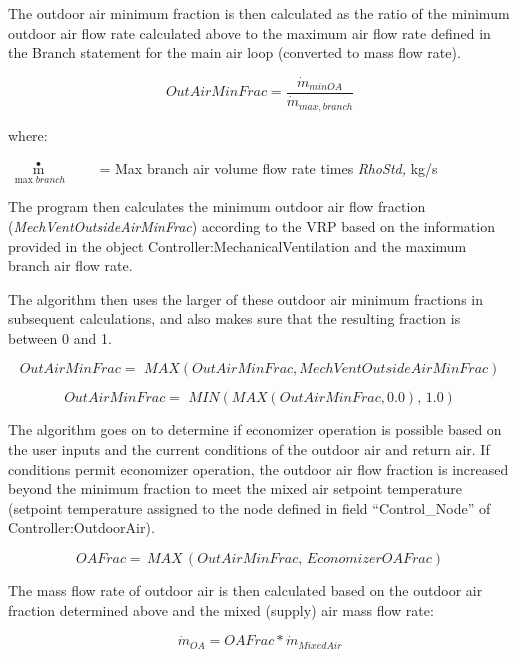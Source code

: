 The outdoor air minimum fraction is then calculated as the ratio of the minimum outdoor air flow rate calculated above to the maximum air flow rate defined in the Branch statement for the main air loop (converted to mass flow rate).

\begin{equation}
  OutAirMinFrac = \frac{\dot{m}_{minOA}}{\dot{m}_{max,branch}}
\end{equation}

where:

\({\mathop m\limits^ \bullet_{\max branch}}\) ~~~ = Max branch air volume flow rate times \emph{RhoStd,} kg/s

The program then calculates the minimum outdoor air flow fraction (\emph{MechVentOutsideAirMinFrac}) according to the VRP based on the information provided in the object Controller:MechanicalVentilation and the maximum branch air flow rate.

The algorithm then uses the larger of these outdoor air minimum fractions in subsequent calculations, and also makes sure that the resulting fraction is between 0 and 1.

\begin{equation}
OutAirMinFrac = \,\,MAX\left( {OutAirMinFrac,MechVentOutsideAirMinFrac} \right)
\end{equation}

\begin{equation}
OutAirMinFrac = \,\,MIN\left( {MAX\left( {OutAirMinFrac,0.0} \right),\,1.0} \right)
\end{equation}

The algorithm goes on to determine if economizer operation is possible based on the user inputs and the current conditions of the outdoor air and return air. If conditions permit economizer operation, the outdoor air flow fraction is increased beyond the minimum fraction to meet the mixed air setpoint temperature (setpoint temperature assigned to the node defined in field ``Control\_Node'' of Controller:OutdoorAir).

\begin{equation}
OAFrac = \,MAX\,(OutAirMinFrac,\,EconomizerOAFrac)
\end{equation}

The mass flow rate of outdoor air is then calculated based on the outdoor air fraction determined above and the mixed (supply) air mass flow rate:

\begin{equation}
{\dot m_{OA}} = OAFrac * {\dot m_{MixedAir}}
\end{equation}

